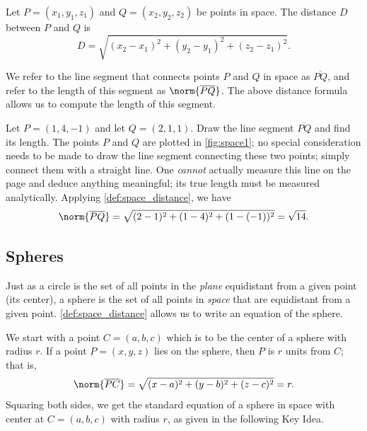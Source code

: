 \begin{definition}\label{def:space_distance}%
Let $P=(x_1,y_1,z_1)$ and $Q = (x_2,y_2,z_2)$ be points in space. The distance $D$ between $P$ and $Q$ is 
\[D = \sqrt{(x_2-x_1)^2+(y_2-y_1)^2+(z_2-z_1)^2}.\]
\end{definition}

We refer to the line segment that connects points $P$ and $Q$ in space as $\overline{PQ}$, and refer to the length of this segment as $\norm{\overline{PQ}}$. The above distance formula allows us to compute the length of this segment.

\begin{example}\label{ex_space1}%
Let $P = (1,4,-1)$ and let $Q = (2,1,1)$. Draw the line segment $\overline{PQ}$ and find its length.
\solution
The points $P$ and $Q$ are plotted in \autoref{fig:space1}; no special consideration needs to be made to draw the line segment connecting these two points; simply connect them with a straight line. One \emph{cannot} actually measure this line on the page and deduce anything meaningful; its true length must be measured analytically. Applying \autoref{def:space_distance}, we have
%
%
\[
\norm{\overline{PQ}}= \sqrt{(2-1)^2+(1-4)^2+(1-(-1))^2} = \sqrt{14}%
.
\]
\end{example}

\subsection{Spheres}

Just as a circle is the set of all points in the \emph{plane} equidistant from a given point (its center), a sphere is the set of all points in \emph{space} that are equidistant from a given point. \autoref{def:space_distance} allows us to write an equation of the sphere.

We start with a point $C = (a,b,c)$ which is to be the center of a sphere with radius $r$. If a point $P=(x,y,z)$ lies on the sphere, then $P$ is $r$ units from $C$; that is, 
\[\norm{\overline{PC}}= \sqrt{(x-a)^2+(y-b)^2+(z-c)^2} = r.\]
Squaring both sides, we get the standard equation of a sphere in space with center at $C=(a,b,c)$ with radius $r$, as given in the following Key Idea.

